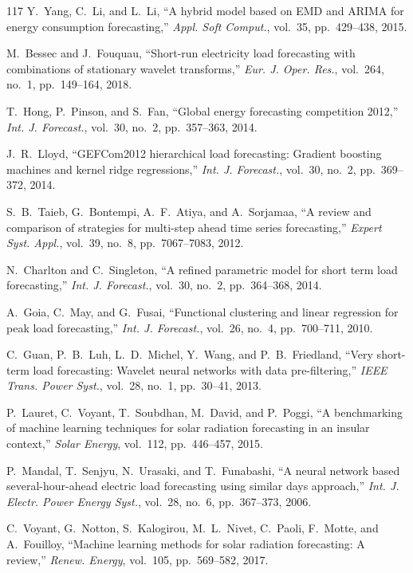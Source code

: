 \documentclass[12pt,a4paper]{article}
\begin{document}
\begin{thebibliography}{117}
 Y.~Yang, C.~Li, and L.~Li, ``A hybrid model based on EMD and ARIMA for energy consumption forecasting,'' \textit{Appl. Soft Comput.}, vol.~35, pp.~429--438, 2015.

 M.~Bessec and J.~Fouquau, ``Short-run electricity load forecasting with combinations of stationary wavelet transforms,'' \textit{Eur. J. Oper. Res.}, vol.~264, no.~1, pp.~149--164, 2018.

 T.~Hong, P.~Pinson, and S.~Fan, ``Global energy forecasting competition 2012,'' \textit{Int. J. Forecast.}, vol.~30, no.~2, pp.~357--363, 2014.

 J.~R.~Lloyd, ``GEFCom2012 hierarchical load forecasting: Gradient boosting machines and kernel ridge regressions,'' \textit{Int. J. Forecast.}, vol.~30, no.~2, pp.~369--372, 2014.

 S.~B.~Taieb, G.~Bontempi, A.~F.~Atiya, and A.~Sorjamaa, ``A review and comparison of strategies for multi-step ahead time series forecasting,'' \textit{Expert Syst. Appl.}, vol.~39, no.~8, pp.~7067--7083, 2012.

 N.~Charlton and C.~Singleton, ``A refined parametric model for short term load forecasting,'' \textit{Int. J. Forecast.}, vol.~30, no.~2, pp.~364--368, 2014.

 A.~Goia, C.~May, and G.~Fusai, ``Functional clustering and linear regression for peak load forecasting,'' \textit{Int. J. Forecast.}, vol.~26, no.~4, pp.~700--711, 2010.

 C.~Guan, P.~B.~Luh, L.~D.~Michel, Y.~Wang, and P.~B.~Friedland, ``Very short-term load forecasting: Wavelet neural networks with data pre-filtering,'' \textit{IEEE Trans. Power Syst.}, vol.~28, no.~1, pp.~30--41, 2013.

 P.~Lauret, C.~Voyant, T.~Soubdhan, M.~David, and P.~Poggi, ``A benchmarking of machine learning techniques for solar radiation forecasting in an insular context,'' \textit{Solar Energy}, vol.~112, pp.~446--457, 2015.

 P.~Mandal, T.~Senjyu, N.~Urasaki, and T.~Funabashi, ``A neural network based several-hour-ahead electric load forecasting using similar days approach,'' \textit{Int. J. Electr. Power Energy Syst.}, vol.~28, no.~6, pp.~367--373, 2006.

 C.~Voyant, G.~Notton, S.~Kalogirou, M.~L.~Nivet, C.~Paoli, F.~Motte, and A.~Fouilloy, ``Machine learning methods for solar radiation forecasting: A review,'' \textit{Renew. Energy}, vol.~105, pp.~569--582, 2017.


\end{thebibliography}
\end{document}
